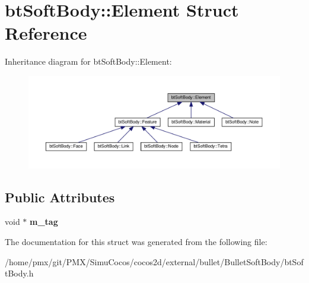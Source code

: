 \hypertarget{structbtSoftBody_1_1Element}{}\section{bt\+Soft\+Body\+:\+:Element Struct Reference}
\label{structbtSoftBody_1_1Element}


Inheritance diagram for bt\+Soft\+Body\+:\+:Element\+:
\nopagebreak
\begin{figure}[H]
\begin{center}
\leavevmode
\includegraphics[width=350pt]{structbtSoftBody_1_1Element__inherit__graph}
\end{center}
\end{figure}
\subsection*{Public Attributes}
\begin{DoxyCompactItemize}
\item 
\mbox{\label{structbtSoftBody_1_1Element_a1291adac8206f851b096f6bd913cae13}} 
void $\ast$ {\bfseries m\+\_\+tag}
\end{DoxyCompactItemize}


The documentation for this struct was generated from the following file\+:\begin{DoxyCompactItemize}
\item 
/home/pmx/git/\+P\+M\+X/\+Simu\+Cocos/cocos2d/external/bullet/\+Bullet\+Soft\+Body/bt\+Soft\+Body.\+h\end{DoxyCompactItemize}
